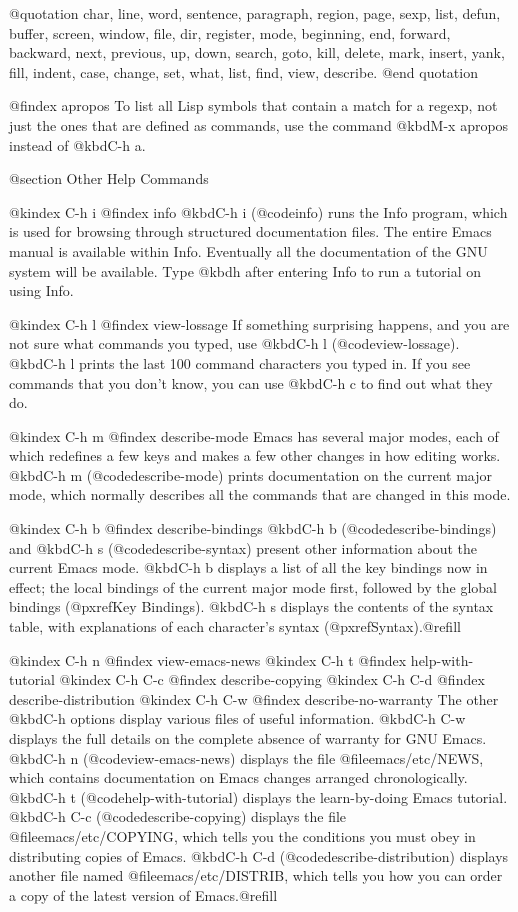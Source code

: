 {{{{{{@quotation
char, line, word, sentence, paragraph, region, page, sexp, list, defun,
buffer, screen, window, file, dir, register, mode,
beginning, end, forward, backward, next, previous, up, down, search, goto,
kill, delete, mark, insert, yank, fill, indent, case,
change, set, what, list, find, view, describe.
@end quotation

@findex apropos
  To list all Lisp symbols that contain a match for a regexp, not just
the ones that are defined as commands, use the command @kbd{M-x apropos}
instead of @kbd{C-h a}.

@section Other Help Commands

@kindex C-h i
@findex info
  @kbd{C-h i} (@code{info}) runs the Info program, which is used for
browsing through structured documentation files.  The entire Emacs manual
is available within Info.  Eventually all the documentation of the GNU
system will be available.  Type @kbd{h} after entering Info to run
a tutorial on using Info.

@kindex C-h l
@findex view-lossage
  If something surprising happens, and you are not sure what commands you
typed, use @kbd{C-h l} (@code{view-lossage}).  @kbd{C-h l} prints the last
100 command characters you typed in.  If you see commands that you don't
know, you can use @kbd{C-h c} to find out what they do.

@kindex C-h m
@findex describe-mode
  Emacs has several major modes, each of which redefines a few keys and
makes a few other changes in how editing works.  @kbd{C-h m} (@code{describe-mode})
prints documentation on the current major mode, which normally describes
all the commands that are changed in this mode.

@kindex C-h b
@findex describe-bindings
  @kbd{C-h b} (@code{describe-bindings}) and @kbd{C-h s}
(@code{describe-syntax}) present other information about the current
Emacs mode.  @kbd{C-h b} displays a list of all the key bindings now
in effect; the local bindings of the current major mode first,
followed by the global bindings (@pxref{Key Bindings}).  @kbd{C-h s}
displays the contents of the syntax table, with explanations of each
character's syntax (@pxref{Syntax}).@refill

@kindex C-h n
@findex view-emacs-news
@kindex C-h t
@findex help-with-tutorial
@kindex C-h C-c
@findex describe-copying
@kindex C-h C-d
@findex describe-distribution
@kindex C-h C-w
@findex describe-no-warranty
  The other @kbd{C-h} options display various files of useful
information.  @kbd{C-h C-w} displays the full details on the complete
absence of warranty for GNU Emacs.  @kbd{C-h n} (@code{view-emacs-news})
displays the file @file{emacs/etc/NEWS}, which contains documentation on
Emacs changes arranged chronologically.  @kbd{C-h t}
(@code{help-with-tutorial}) displays the learn-by-doing Emacs tutorial.
@kbd{C-h C-c} (@code{describe-copying}) displays the file
@file{emacs/etc/COPYING}, which tells you the conditions you must obey
in distributing copies of Emacs.  @kbd{C-h C-d}
(@code{describe-distribution}) displays another file named
@file{emacs/etc/DISTRIB}, which tells you how you can order a copy of
the latest version of Emacs.@refill

}}}}}}
